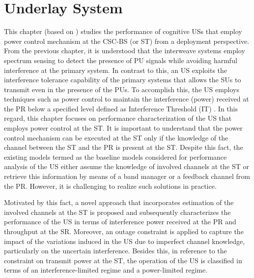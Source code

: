 \chapter{Underlay System}
\label{chap:US}


This chapter (based on ) studies the performance of cognitive USs that employ power control mechanism at the CSC-BS (or ST) from a deployment perspective. 
From the previous chapter, it is understood that the interweave systems employ spectrum sensing to detect the presence of PU signals while avoiding harmful interference at the primary system. In contrast to this, an US exploits the interference tolerance capability of the primary systems that allows the SUs to transmit even in the presence of the PUs. To accomplish this, the US employs techniques such as power control to maintain the interference (power) received at the PR below a specified level defined as Interference Threshold (IT) \cite{Xing07}. In this regard, this chapter focuses on performance characterization of the US that employs power control at the ST. It is important to understand that the power control mechanism can be executed at the ST only if the knowledge of the channel between the ST and the PR is present at the ST. Despite this fact, the existing models termed as the baseline models considered for performance analysis of the US either assume the knowledge of involved channels at the ST or retrieve this information by means of a band manager or a feedback channel from the PR. However, it is challenging to realize such solutions in practice. 

Motivated by this fact, a novel approach that incorporates estimation of the involved channels at the ST is proposed and subsequently characterizes the performance of the US in terms of interference power received at the PR and throughput at the SR. Moreover, an outage constraint is applied to capture the impact of the variations induced in the US due to imperfect channel knowledge, particularly on the uncertain interference. Besides this, in reference to the constraint on transmit power at the ST, the operation of the US is classified in terms of an interference-limited regime and a power-limited regime. 

